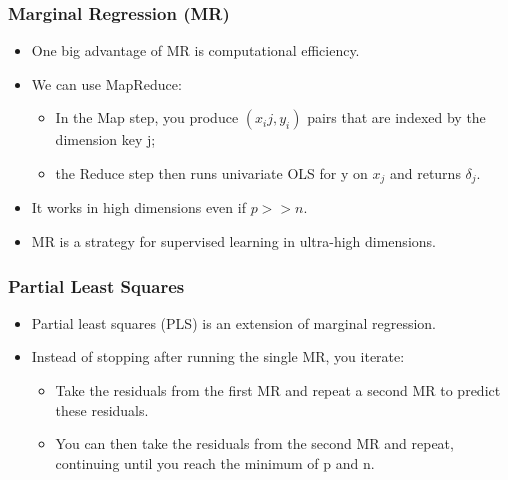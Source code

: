 \documentclass[
  shownotes,
  xcolor={svgnames},
  hyperref={colorlinks,citecolor=DarkBlue,linkcolor=DarkRed,urlcolor=DarkBlue}
  , aspectratio=169]{beamer}
\begin{document}
\begin{frame}[fragile]
\frametitle{Marginal Regression (MR)}

\begin{itemize}

\item One big advantage of MR is computational efficiency. 
\medskip
\item We can use MapReduce:
\medskip
\begin{itemize}
\item In the Map step, you produce $(x_ij, y_i)$ pairs that are indexed by the dimension key j; 
\medskip
\item the Reduce step then runs univariate OLS for y on $x_j$ and returns $\delta_j$. 
\medskip
\end{itemize}
\item It works in high dimensions even if $p >> n$.
\medskip
\item MR is a strategy for supervised learning in ultra-high dimensions.
\end{itemize} 


\end{frame}
\begin{frame}[fragile]
\frametitle{Partial Least Squares }

\begin{itemize}
\item Partial least squares (PLS) is an extension of marginal regression.
\pause 
\medskip
\item  Instead of stopping after running the single MR, you iterate: 
\medskip
\begin{itemize}
  \item Take the residuals from the first MR and repeat a second MR to predict these residuals. 
  \medskip
  \item You can then take the residuals from the second MR and repeat, continuing until you reach the minimum of p and n. 
\end{itemize}
\end{itemize}
\end{frame}
\end{document}
